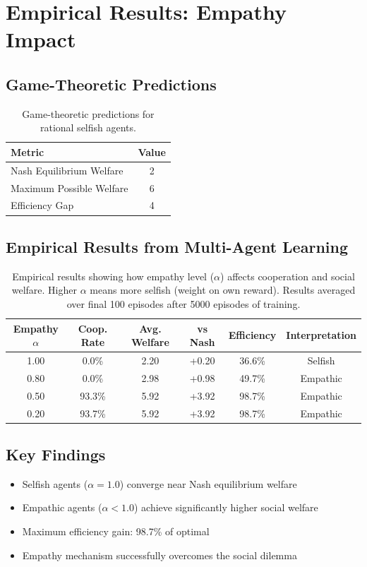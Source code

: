 
\section{Empirical Results: Empathy Impact}

\subsection{Game-Theoretic Predictions}

\begin{table}[h]
\centering
\begin{tabular}{lc}
\hline
Metric & Value \\
\hline
Nash Equilibrium Welfare & 2 \\
Maximum Possible Welfare & 6 \\
Efficiency Gap & 4 \\
\hline
\end{tabular}
\caption{Game-theoretic predictions for rational selfish agents.}
\label{tab:theoretical_predictions}
\end{table}

\subsection{Empirical Results from Multi-Agent Learning}

\begin{table}[h]
\centering
\begin{tabular}{cccccc}
\hline
Empathy $\alpha$ & Coop. Rate & Avg. Welfare & vs Nash & Efficiency & Interpretation \\
\hline
1.00 & 0.0\% & 2.20 & +0.20 & 36.6\% & Selfish \\
0.80 & 0.0\% & 2.98 & +0.98 & 49.7\% & Empathic \\
0.50 & 93.3\% & 5.92 & +3.92 & 98.7\% & Empathic \\
0.20 & 93.7\% & 5.92 & +3.92 & 98.7\% & Empathic \\
\hline
\end{tabular}
\caption{Empirical results showing how empathy level ($\alpha$) affects cooperation and social welfare. Higher $\alpha$ means more selfish (weight on own reward). Results averaged over final 100 episodes after 5000 episodes of training.}
\label{tab:empathy_impact}
\end{table}

\subsection{Key Findings}

\begin{itemize}
\item Selfish agents ($\alpha=1.0$) converge near Nash equilibrium welfare
\item Empathic agents ($\alpha<1.0$) achieve significantly higher social welfare
\item Maximum efficiency gain: 98.7\% of optimal
\item Empathy mechanism successfully overcomes the social dilemma
\end{itemize}
